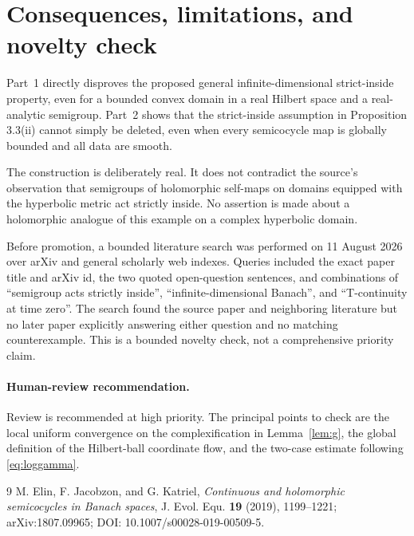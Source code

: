 \documentclass[11pt]{article}
\begin{document}
\section{Consequences, limitations, and novelty check}

Part~1 directly disproves the proposed general infinite-dimensional
strict-inside property, even for a bounded convex domain in a real Hilbert
space and a real-analytic semigroup. Part~2 shows that the strict-inside
assumption in Proposition 3.3(ii) cannot simply be deleted, even when every
semicocycle map is globally bounded and all data are smooth.

The construction is deliberately real. It does not contradict the source's
observation that semigroups of holomorphic self-maps on domains equipped with
the hyperbolic metric act strictly inside. No assertion is made about a
holomorphic analogue of this example on a complex hyperbolic domain.

Before promotion, a bounded literature search was performed on 11 August 2026
over arXiv and general scholarly web indexes. Queries included the exact paper
title and arXiv id, the two quoted open-question sentences, and combinations of
``semigroup acts strictly inside'', ``infinite-dimensional Banach'', and
``T-continuity at time zero''. The search found the source paper and neighboring
literature but no later paper explicitly answering either question and no
matching counterexample. This is a bounded novelty check, not a comprehensive
priority claim.

\paragraph{Human-review recommendation.}
Review is recommended at high priority. The principal points to check are the
local uniform convergence on the complexification in Lemma~\ref{lem:g}, the
global definition of the Hilbert-ball coordinate flow, and the two-case
estimate following \eqref{eq:loggamma}.

\begin{thebibliography}{9}
M. Elin, F. Jacobzon, and G. Katriel,
\emph{Continuous and holomorphic semicocycles in Banach spaces},
J. Evol. Equ. \textbf{19} (2019), 1199--1221;
arXiv:1807.09965; DOI: 10.1007/s00028-019-00509-5.
\end{thebibliography}
\end{document}
